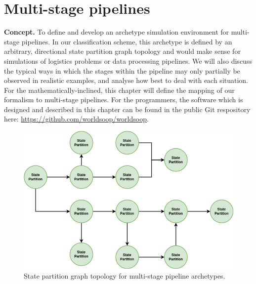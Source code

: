 \chapter{\sffamily Multi-stage pipelines}

{\bfseries\sffamily Concept.} To define and develop an archetype simulation environment for multi-stage pipelines. In our classification scheme, this archetype is defined by an arbitrary, directional state partition graph topology and would make sense for simulations of logistics problems or data processing pipelines. We will also discuss the typical ways in which the stages within the pipeline may only partially be observed in realistic examples, and analyse how best to deal with each situation. For the mathematically-inclined, this chapter will define the mapping of our formalism to multi-stage pipelines. For the programmers, the software which is designed and described in this chapter can be found in the public Git respository here: \href{https://github.com/worldsoop/worldsoop}{https://github.com/worldsoop/worldsoop}.


\begin{figure}[h]
\centering
\includegraphics[width=12cm]{images/chapter-9-state-partition-graph.drawio.png}
\caption{State partition graph topology for multi-stage pipeline archetypes.}
\label{fig:state-partition-graph-multi-stage-pipelines}
\end{figure}
